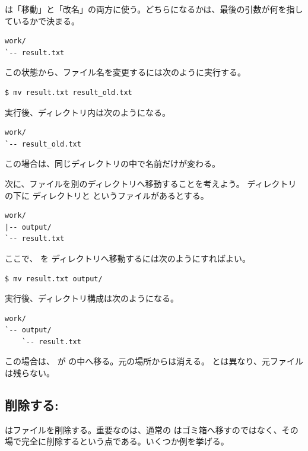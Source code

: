  は「移動」と「改名」の両方に使う。どちらになるかは、最後の引数が何を指しているかで決まる。

\begin{lstlisting}[numbers=none, xleftmargin=2\zw]
work/
`-- result.txt
\end{lstlisting}

この状態から、ファイル名を変更するには次のように実行する。

\begin{lstlisting}[numbers=none, xleftmargin=2\zw]
$ mv result.txt result_old.txt
\end{lstlisting}

実行後、ディレクトリ内は次のようになる。

\begin{lstlisting}[numbers=none, xleftmargin=2\zw]
work/
`-- result_old.txt
\end{lstlisting}

この場合は、同じディレクトリの中で名前だけが変わる。

次に、ファイルを別のディレクトリへ移動することを考えよう。 ディレクトリの下に  ディレクトリと  というファイルがあるとする。

\begin{lstlisting}[numbers=none, xleftmargin=2\zw]
work/
|-- output/
`-- result.txt
\end{lstlisting}

ここで、 を  ディレクトリへ移動するには次のようにすればよい。

\begin{lstlisting}[numbers=none, xleftmargin=2\zw]
$ mv result.txt output/
\end{lstlisting}

実行後、ディレクトリ構成は次のようになる。

\begin{lstlisting}[numbers=none, xleftmargin=2\zw]
work/
`-- output/
    `-- result.txt
\end{lstlisting}

この場合は、 が  の中へ移る。元の場所からは消える。 とは異なり、元ファイルは残らない。

\subsection{削除する: }

 はファイルを削除する。重要なのは、通常の  はゴミ箱へ移すのではなく、その場で完全に削除するという点である。いくつか例を挙げる。

